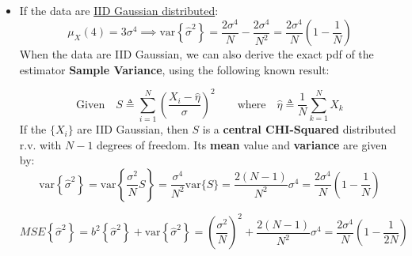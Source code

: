 \begin{itemize}
$$
E\{ \hat{\sigma}^2 \}
= E\left\{ \frac{1}{N} \sum_{i=1}^N X_i^2 - \hat{\eta}^2 \right\}
= E\left\{ \frac{1}{N} \sum_{i=1}^N X_i^2 \right\} - E\left\{ \hat{\eta}^2 \right\}
$$

$$
= \frac{1}{N} \sum_{i=1}^N E\{ X_i^2 \}
- \left( \mathrm{var}\{\hat{\eta}\} + (E\{ \hat{\eta} \})^2 \right)
= \frac{1}{N} \sum_{i=1}^N (\sigma^2 + \eta^2)
- \left( \frac{\sigma^2}{N} + \eta^2 \right)
$$

$$
= \sigma^2 - \frac{\sigma^2}{N}
= \left( 1 - \frac{1}{N} \right) \sigma^2
$$


    \noindent As concerning the \textbf{variance} of the Sample variance for IID data:\\
$$
\mathrm{var}\left\{ \hat{\sigma}^2 \right\}
= \frac{ \mu_X(4) - \sigma^4 }{N}
- \frac{ 2 \left( \mu_X(4) - 2\sigma^4 \right) }{N^2}
+ \frac{ \mu_X(4) - 3\sigma^4 }{N^3}
$$

$$
\text{where} \quad \mu_X(4) \triangleq E\left\{ (X_i - \eta)^4 \right\}
$$

    \item If the data are \underline{IID Gaussian distributed}:
    $$
\mu_X(4) = 3\sigma^4
\implies
\mathrm{var}\left\{\hat{\sigma}^2 \right\}
= \frac{2\sigma^4}{N} - \frac{2\sigma^4}{N^2}
= \frac{2\sigma^4}{N} \left( 1 - \frac{1}{N} \right)
$$
    \noindent When the data are IID Gaussian, we can also derive the exact pdf of the estimator \textbf{Sample Variance}, using the following known result:

    $$
\text{Given} \quad
S \triangleq \sum_{i=1}^{N} \left( \frac{X_i - \hat{\eta}}{\sigma} \right)^2
\qquad
\text{where} \quad
\hat{\eta} \triangleq \frac{1}{N} \sum_{k=1}^{N} X_k
$$
    If the \(\{X_i\}\) are IID Gaussian, then \(S\) is a \textbf{central CHI-Squared} distributed r.v. with \(N-1\) degrees of freedom. Its \textbf{mean} value and \textbf{variance} are given by:
$$
\mathrm{var}\left\{ \hat{\sigma}^2 \right\}
= \mathrm{var}\left\{ \frac{\sigma^2}{N} S \right\}
= \frac{\sigma^4}{N^2} \mathrm{var}\{ S \}
= \frac{2(N-1)}{N^2} \sigma^4
= \frac{2\sigma^4}{N} \left( 1-\frac{1}{N} \right)
$$

$$
MSE\left\{ \hat{\sigma}^2 \right\}
= b^2\left\{ \hat{\sigma}^2 \right\} + \mathrm{var}\left\{ \hat{\sigma}^2 \right\}
= \left( \frac{\sigma^2}{N} \right)^2
+ \frac{2(N-1)}{N^2} \sigma^4
= \frac{2\sigma^4}{N} \left( 1 - \frac{1}{2N} \right)
$$




\end{itemize}
